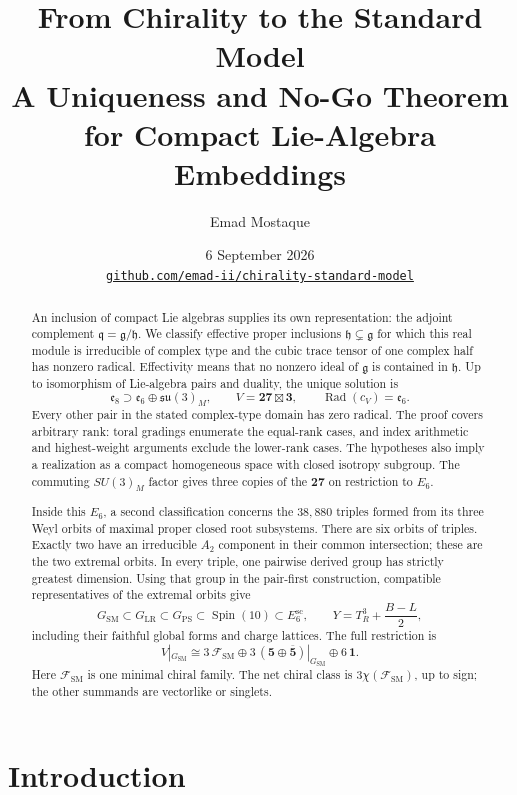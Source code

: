 \documentclass[11pt]{article}
\title{From Chirality to the Standard Model\\[0.45em]
\large A Uniqueness and No-Go Theorem for Compact Lie-Algebra Embeddings}
\author{Emad Mostaque}
\date{6 September 2026\\[0.5em]
\small\href{https://github.com/emad-ii/chirality-standard-model}
{\nolinkurl{github.com/emad-ii/chirality-standard-model}}}
\theoremstyle{remark}
\begin{document}
\maketitle

\begin{abstract}
An inclusion of compact Lie algebras supplies its own representation: the
adjoint complement \(\mathfrak q=\mathfrak g/\mathfrak h\). We classify
effective proper inclusions \(\mathfrak h\subsetneq\mathfrak g\) for which
this real module is irreducible of complex type and the cubic trace tensor
of one complex half has nonzero radical. Effectivity means that no nonzero
ideal of \(\mathfrak g\) is contained in \(\mathfrak h\). Up to
isomorphism of Lie-algebra pairs and duality, the unique solution is
\[
 \mathfrak e_8\supset\mathfrak e_6\oplus\mathfrak{su}(3)_M,
 \qquad V=\mathbf{27}\boxtimes\mathbf3,
 \qquad \operatorname{Rad}(c_V)=\mathfrak e_6.
\]
Every other pair in the stated complex-type domain has zero radical. The
proof covers arbitrary rank: toral gradings enumerate the equal-rank cases,
and index arithmetic and highest-weight arguments exclude the lower-rank
cases. The hypotheses also imply a realization as a compact homogeneous
space with closed isotropy subgroup. The commuting \(SU(3)_M\) factor gives three copies of the
\(\mathbf{27}\) on restriction to \(E_6\).

Inside this \(E_6\), a second classification concerns the \(38{,}880\)
triples formed from its three Weyl orbits of maximal proper closed root
subsystems. There are six orbits of triples. Exactly two have an irreducible
\(A_2\) component in their common intersection; these are the two extremal
orbits. In every triple, one pairwise derived group has strictly greatest
dimension. Using that group in the pair-first construction, compatible
representatives of the extremal orbits give
\[
 G_{\mathrm{SM}}\subset G_{\mathrm{LR}}\subset G_{\mathrm{PS}}
 \subset\operatorname{Spin}(10)\subset E_6^{\mathrm{sc}},
 \qquad Y=T_R^3+\frac{B-L}{2},
\]
including their faithful global forms and charge lattices. The full restriction is
\[
 V|_{G_{\mathrm{SM}}}
 \cong3\,\mathcal F_{\mathrm{SM}}
 \oplus3\,(\mathbf5\oplus\overline{\mathbf5})|_{G_{\mathrm{SM}}}
 \oplus6\,\mathbf1.
\]
Here \(\mathcal F_{\mathrm{SM}}\) is one minimal chiral family. The net
chiral class is \(3\chi(\mathcal F_{\mathrm{SM}})\), up to sign; the
other summands are vectorlike or singlets.
\end{abstract}
\clearpage

\section{Introduction}
\end{document}
